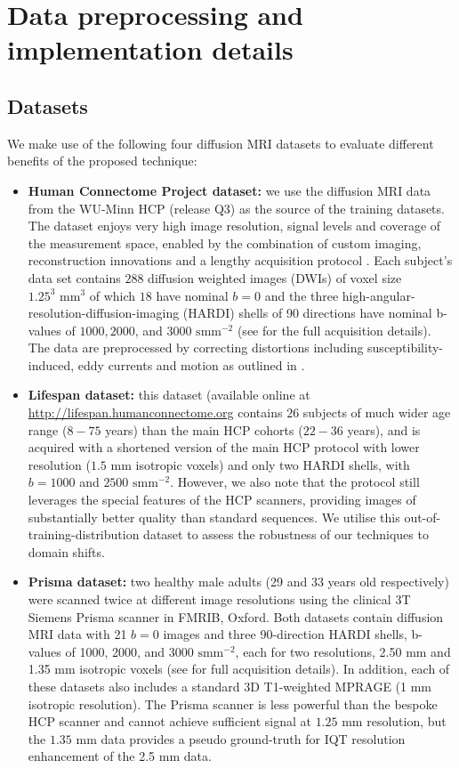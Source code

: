 \section{Data preprocessing and implementation details}
\subsection{Datasets} \label{sec:dataset}
We make use of the following four diffusion MRI datasets to evaluate different benefits of the proposed technique: 

\begin{itemize}
	\item \textbf{Human Connectome Project dataset: } we use the diffusion MRI data from the WU-Minn HCP (release Q3) \cite{van2013wu} as the source of the training datasets. The dataset enjoys very high image resolution, signal levels and coverage of the measurement space, enabled by the combination of custom imaging, reconstruction innovations and a lengthy acquisition protocol \cite{sotiropoulos2013advances}. Each subject's data set contains $288$ diffusion weighted images (DWIs) of voxel size $1.25^{3} \text{ mm}^{3}$ of which $18$ have nominal $b=0$ and the three high-angular-resolution-diffusion-imaging (HARDI) shells of 90 directions have nominal b-values of $1000, 2000$, and $3000 \text{ smm}^{-2}$ (see \cite{sotiropoulos2013advances} for the full acquisition details). The data are preprocessed by correcting distortions including susceptibility-induced, eddy currents and motion as outlined in \cite{glasser2013minimal}.
	
	\item \textbf{Lifespan dataset:} this dataset (available online at \url{http://lifespan.humanconnectome.org} contains $26$ subjects of much wider age range ($8-75$ years) than the main HCP cohorts ($22-36$ years), and is acquired with a shortened version of the main HCP protocol with lower resolution ($1.5$ mm isotropic voxels) and only two HARDI shells, with $b = 1000$ and $2500 \text{ smm}^{-2}$. However, we also note that the protocol still leverages the special features of the HCP scanners, providing images of substantially better quality than standard sequences. We utilise this out-of-training-distribution dataset  to assess the robustness of our techniques to domain shifts. 
	
	\item \textbf{Prisma dataset:} two healthy male adults (29 and 33 years old respectively) were scanned twice at different image resolutions using the clinical 3T Siemens Prisma scanner in FMRIB, Oxford. Both datasets contain diffusion MRI data with 21 $b=0$ images and three 90-direction HARDI shells, b-values of 1000, 2000, and $3000 \text{ smm}^{-2}$, each for two resolutions, 2.50 mm and 1.35 mm isotropic voxels  (see \cite{alexander2017image} for full acquisition details). In addition, each of these datasets also includes a standard 3D T1-weighted MPRAGE (1 mm isotropic resolution). The Prisma scanner is less powerful than the bespoke HCP scanner and cannot achieve sufficient signal at $1.25$ mm resolution, but the $1.35$ mm data provides a pseudo ground-truth for IQT resolution enhancement of the 2.5 mm data. 
	

\end{itemize}
